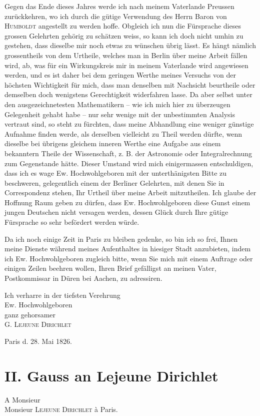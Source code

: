 \documentclass[11pt]{article}
\newcommand{\scn}[1]{\textsc{#1}}
\begin{document}
Gegen das Ende dieses Jahres werde ich nach meinem Vaterlande Preussen zurückkehren, wo ich durch die gütige Verwendung des Herrn Baron von \scn{Humboldt} angestellt zu werden hoffe. Obgleich ich nun die Fürsprache dieses grossen Gelehrten gehörig zu schätzen weiss, so kann ich doch nicht umhin zu gestehen, dass dieselbe mir noch etwas zu wünschen übrig lässt. Es hängt nämlich grossentheils von dem Urtheile, welches man in Berlin über meine Arbeit fällen wird, ab, was für ein Wirkungskreis mir in meinem Vaterlande wird angewiesen werden, und es ist daher bei dem geringen Werthe meines Versuchs von der höchsten Wichtigkeit für mich, dass man denselben mit Nachsicht beurtheile oder demselben doch wenigstens Gerechtigkeit widerfahren lasse. Da aber selbst unter den ausgezeichnetesten Mathematikern -- wie ich mich hier zu überzeugen Gelegenheit gehabt habe -- nur sehr wenige mit der unbestimmten Analysis vertraut sind, so steht zu fürchten, dass meine Abhandlung eine weniger günstige Aufnahme finden werde, als derselben vielleicht zu Theil werden dürfte, wenn dieselbe bei übrigens gleichem inneren Werthe eine Aufgabe aus einem bekanntern Theile der Wissenschaft, z. B. der Astronomie oder Integralrechnung zum Gegenstande hätte. Dieser Umstand wird mich einigermassen entschuldigen, dass ich es wage Ew. Hochwohlgeboren mit der unterthänigsten Bitte zu beschweren, gelegentlich einem der Berliner Gelehrten, mit denen Sie in Correspondenz stehen, Ihr Urtheil über meine Arbeit mitzutheilen. Ich glaube der Hoffnung Raum geben zu dürfen, dass Ew. Hochwohlgeboren diese Gunst einem jungen Deutschen nicht versagen werden, dessen Glück durch Ihre gütige Fürsprache so sehr befördert werden würde.

Da ich noch einige Zeit in Paris zu bleiben gedenke, so bin ich so frei, Ihnen meine Dienste während meines Aufenthaltes in hiesiger Stadt anzubieten, indem ich Ew. Hochwohlgeboren zugleich bitte, wenn Sie mich mit einem Auftrage oder einigen Zeilen beehren wollen, Ihren Brief gefälligst an meinen Vater, Postkommissar in Düren bei Aachen, zu adressiren.

\begin{flushright}
Ich verharre in der tiefsten Verehrung\\[0.4em]
Ew. Hochwohlgeboren\\
ganz gehorsamer\\
\scn{G. Lejeune Dirichlet}
\end{flushright}
Paris d. 28. Mai 1826.

\section*{II. Gauss an Lejeune Dirichlet}
\begin{flushleft}
A Monsieur\\
\hspace*{2em}Monsieur \scn{Lejeune Dirichlet} à Paris.
\end{flushleft}
\end{document}
